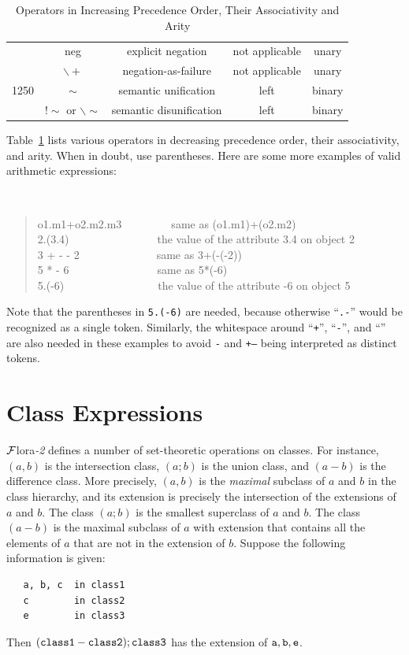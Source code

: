 \documentclass[11pt]{article}
\newcommand{\FLORA}{{\mbox{\sc ${\cal F}${lora}\rm\emph{-2}}}\xspace}
\begin{document}
\begin{table}[tb]
{\begin{tabular}{|c|c|c|c|c|}
            & neg & explicit negation & not applicable & unary \\ \cline{2-5}
            & $\backslash+$ & negation-as-failure & not applicable & unary \\ \hline
1250        & $\sim$ & semantic unification & left & binary \\ \cline{2-5}
            & $!\sim$ or $\backslash\sim$ & semantic disunification & left & binary \\ \cline{2-5}
\hline
\end{tabular}
}
\caption{Operators in Increasing Precedence Order, Their Associativity and Arity}
\label{tab:tab-op-pre}
\end{table}

Table~\ref{tab:tab-op-pre} lists various operators in decreasing precedence
order, their associativity, and arity.  When in doubt, use parentheses.
Here are some more examples of valid arithmetic expressions:
{\tt
\begin{quote}
o1.m1+o2.m2.m3~~~~~~~~~{\rm same as} (o1.m1)+(o2.m2)\\
2.(3.4)~~~~~~~~~~~~~~~~{\rm the value of the attribute} 3.4 {\rm on object} 2\\
3 + - - 2~~~~~~~~~~~~~~{\rm same as} 3+(-(-2))\\
5 * - 6~~~~~~~~~~~~~~~~{\rm same as} 5*(-6)\\
5.(-6)~~~~~~~~~~~~~~~~~{\rm the value of the attribute} -6 {\rm on object} 5
\end{quote}
}
Note that the parentheses in {\tt 5.(-6)} are needed,
because otherwise ``{\tt .-}'' would be recognized as a single token.
Similarly, the whitespace around ``{\tt +}'', ``{\tt -}'', and ``{\tt *}''
are also needed in these examples to avoid {\tt *-} and {\tt +--} being
interpreted as distinct tokens.

\section{Class Expressions}
\label{sec-class-expr}

\FLORA defines a number of set-theoretic
operations on classes. For instance, $(a,b)$ is the
intersection class, $(a;b)$ is the union class, and $(a-b)$ is
the difference class. More precisely, $(a,b)$ is the \emph{maximal}
subclass of $a$ and $b$ in the class hierarchy, and its extension is
precisely the intersection of the extensions of $a$ and $b$. The class
$(a;b)$ is the smallest superclass of $a$ and $b$. The class $(a-b)$ is the
maximal subclass of $a$ with extension that contains all the elements of
$a$ that are not in the extension of $b$.
Suppose
the following information is given:
\begin{verbatim}
   a, b, c  in class1
   c        in class2
   e        in class3
\end{verbatim}
Then $\tt (class1 - class2) ; class3$ has the extension of $\tt a,b,e$.
\end{document}
